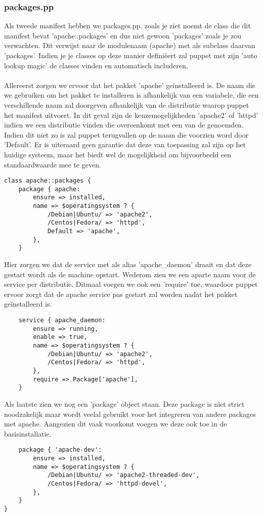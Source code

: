 \subsubsection{packages.pp}
Als tweede manifest hebben we packages.pp. zoals je ziet noemt de class die dit manifest bevat 'apache::packages' en dus niet gewoon 'packages' zoals je zou verwachten. Dit verwijst naar de modulenaam (apache) met als subclass daarvan 'packages'. Indien je je classes op deze manier defini\"eert zal puppet met zijn 'auto lookup magic' de classes vinden en automatisch includeren.\\\\
Allereerst zorgen we ervoor dat het pakket 'apache' ge\"installeerd is. De naam die we gebruiken om het pakket te installeren is afhankelijk van een variabele, die een verschillende naam zal doorgeven afhankelijk van de distributie waarop puppet het manifest uitvoert. In dit geval zijn de keuzemogelijkheden 'apache2' of 'httpd' indien we een distributie vinden die overeenkomt met een van de genoemden. Indien dit niet zo is zal puppet terugvallen op de naam die voorzien word door 'Default'. Er is uiteraard geen garantie dat deze van toepassing zal zijn op het huidige systeem, maar het biedt wel de mogelijkheid om bijvoorbeeld een standaardwaarde mee te geven.
\begin{code}
\begin{lstlisting}
class apache::packages {
	package { apache:
		ensure => installed,
		name => $operatingsystem ? {
			/Debian|Ubuntu/ => 'apache2',
			/Centos|Fedora/ => 'httpd',
			Default => 'apache',
		},
	}
\end{lstlisting}
\end{code}
%
Hier zorgen we dat de service met als alias 'apache\_daemon' draait en dat deze gestart wordt als de machine opstart. Wederom zien we een aparte naam voor de service per distributie. Ditmaal voegen we ook een 'require' toe, waardoor puppet ervoor zorgt dat de apache service pas gestart zal worden nadat het pakket ge\"installeerd is.
%
\begin{code}
\begin{lstlisting}
	service { apache_daemon:
		ensure => running,
		enable => true,
		name => $operatingsystem ? {
			/Debian|Ubuntu/ => 'apache2',
			/Centos|Fedora/ => 'httpd',
		},
		require => Package['apache'],
	}
\end{lstlisting}
\end{code}
%
Als laatste zien we nog een 'package' object staan. Deze package is niet strict noodzakelijk maar wordt veelal gebruikt voor het integreren van andere packages met apache. Aangezien dit vaak voorkomt voegen we deze ook toe in de basisinstallatie.
%
\begin{code}
\begin{lstlisting}
	package { 'apache-dev':
		ensure => installed,
		name => $operatingsystem ? {
			/Debian|Ubuntu/ => 'apache2-threaded-dev',
			/Centos|Fedora/ => 'httpd-devel',
		},
	}
}
\end{lstlisting}
\end{code}
%
